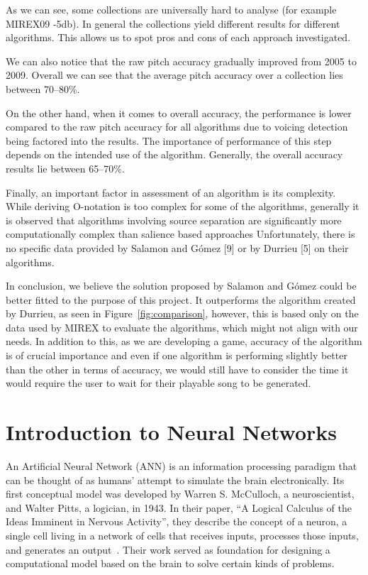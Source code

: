 As we can see, some collections are universally hard to analyse (for example MIREX09 -5db). In general the collections yield different results for different algorithms. This allows us to spot pros and cons of each approach investigated.

We can also notice that the raw pitch accuracy gradually improved from 2005 to 2009. Overall we can see that the average pitch accuracy over a collection lies between 70--80\%.

On the other hand, when it comes to overall accuracy, the performance is lower compared to the raw pitch accuracy for all algorithms due to voicing detection being factored into the results. The importance of performance of this step depends on the intended use of the algorithm. Generally, the overall accuracy results lie between 65--70\%.

Finally, an important factor in assessment of an algorithm is its complexity. While deriving O-notation is too complex for some of the algorithms, generally it is observed that algorithms involving source separation are significantly more computationally complex than salience based approaches Unfortunately, there is no specific data provided by Salamon and G\'{o}mez [9] or by Durrieu [5] on their algorithms.

In conclusion, we believe the solution proposed by Salamon and G\'{o}mez could be better fitted to the purpose of this project. It outperforms the algorithm created by Durrieu, as seen in Figure~\ref{fig:comparison}, however, this is based only on the data used by MIREX to evaluate the algorithms, which might not align with our needs. In addition to this, as we are developing a game, accuracy of the algorithm is of crucial importance and even if one algorithm is performing slightly better than the other in terms of accuracy, we would still have to consider the time it would require the user to wait for their playable song to be generated. 

\newpage


\section{Introduction to Neural Networks}
\vspace{10pt}

An Artificial Neural Network (ANN) is an information processing paradigm that can be thought of as humans' attempt to simulate the brain electronically. Its first conceptual model was developed by Warren S. McCulloch, a neuroscientist, and Walter Pitts, a logician, in 1943. In their paper, ``A Logical Calculus of the Ideas Imminent in Nervous Activity'', they describe the concept of a neuron, a single cell living in a network of cells that receives inputs, processes those inputs, and generates an output~\cite{firstNN}. Their work served as foundation for designing a computational model based on the brain to solve certain kinds of problems.

